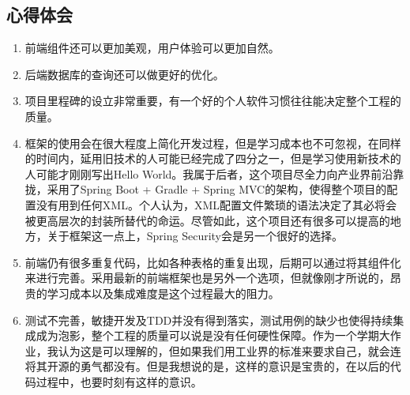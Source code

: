 \documentclass[11pt]{article}
\begin{document}
\subsection{心得体会}
\begin{enumerate}
  \item 前端组件还可以更加美观，用户体验可以更加自然。
  \item 后端数据库的查询还可以做更好的优化。
  \item 项目里程碑的设立非常重要，有一个好的个人软件习惯往往能决定整个工程的质量。
  \item 框架的使用会在很大程度上简化开发过程，但是学习成本也不可忽视，在同样的时间内，延用旧技术的人可能已经完成了四分之一，但是学习使用新技术的人可能才刚刚写出Hello World。我属于后者，这个项目尽全力向产业界前沿靠拢，采用了Spring Boot + Gradle + Spring MVC的架构，使得整个项目的配置没有用到任何XML。个人认为，XML配置文件繁琐的语法决定了其必将会被更高层次的封装所替代的命运。尽管如此，这个项目还有很多可以提高的地方，关于框架这一点上，Spring Security会是另一个很好的选择。
  \item 前端仍有很多重复代码，比如各种表格的重复出现，后期可以通过将其组件化来进行完善。采用最新的前端框架也是另外一个选项，但就像刚才所说的，昂贵的学习成本以及集成难度是这个过程最大的阻力。
  \item 测试不完善，敏捷开发及TDD并没有得到落实，测试用例的缺少也使得持续集成成为泡影，整个工程的质量可以说是没有任何硬性保障。作为一个学期大作业，我认为这是可以理解的，但如果我们用工业界的标准来要求自己，就会连将其开源的勇气都没有。但是我想说的是，这样的意识是宝贵的，在以后的代码过程中，也要时刻有这样的意识。
\end{enumerate}
\end{document}
